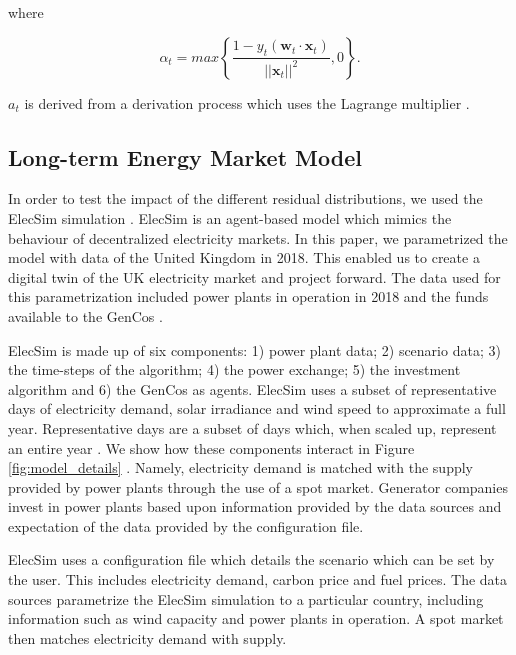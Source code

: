 \documentclass[final,3p,times,twocolumn,numbers]{elsarticle}
\begin{document}
\noindent where 

\begin{equation}
\alpha_t=max\left\{\frac{1-y_t(\boldsymbol{w}_t\cdot\boldsymbol{x}_t)}{\left|\left|\boldsymbol{x}_t\right|\right|^2},0\right\}. 	
\end{equation}

\noindent $a_t$ is derived from a derivation process which uses the Lagrange multiplier \cite{Gzik2014}.

\subsection{Long-term Energy Market Model}


In order to test the impact of the different residual distributions, we used the ElecSim simulation \cite{Kell,Kell2020}. ElecSim is an agent-based model which mimics the behaviour of decentralized electricity markets. In this paper, we parametrized the model with data of the United Kingdom in 2018. This enabled us to create a digital twin of the UK electricity market and project forward. The data used for this parametrization included power plants in operation in 2018 and the funds available to the GenCos \cite{dukes_511, companies_house}.

ElecSim is made up of six components: 1) power plant data; 2) scenario data; 3) the time-steps of the algorithm; 4) the power exchange; 5) the investment algorithm and 6) the GenCos as agents. ElecSim uses a subset of representative days of electricity demand, solar irradiance and wind speed to approximate a full year. Representative days are a subset of days which, when scaled up, represent an entire year \cite{Kell2020}. We show how these components interact in Figure \ref{fig:model_details} \cite{Kell}. Namely, electricity demand is matched with the supply provided by power plants through the use of a spot market. Generator companies invest in power plants based upon information provided by the data sources and expectation of the data provided by the configuration file. 



ElecSim uses a configuration file which details the scenario which can be set by the user. This includes electricity demand, carbon price and fuel prices. The data sources parametrize the ElecSim simulation to a particular country, including information such as wind capacity and power plants in operation. A spot market then matches electricity demand with supply.
\end{document}

